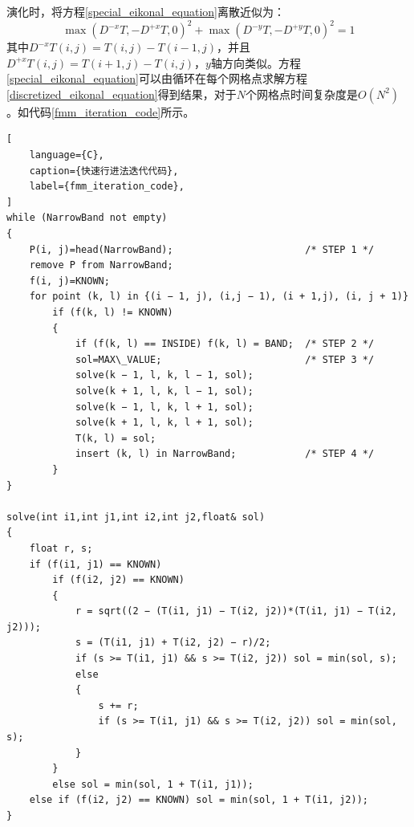 演化时，将方程\ref{special_eikonal_equation}离散近似为：
\begin{equation}
    \label{discretized_eikonal_equation}
    \max(D^{-x}T, -D^{+x}T, 0)^2 + \max(D^{-y}T, -D^{+y}T, 0)^2 = 1
\end{equation}
其中$D^{-x}T(i, j) = T(i, j) - T(i - 1, j)$，并且$D^{+x}T(i, j) = T(i + 1, j) - T(i, j)$，$y$轴方向类似。方程\ref{special_eikonal_equation}可以由循环在每个网格点求解方程\ref{discretized_eikonal_equation}得到结果，对于$N$个网格点时间复杂度是$O(N^2)$。如代码\ref{fmm_iteration_code}所示。
\begin{lstlisting}[
    language={C},
    caption={快速行进法迭代代码},
    label={fmm_iteration_code},
]
while (NarrowBand not empty)
{
    P(i, j)=head(NarrowBand); 						/* STEP 1 */
    remove P from NarrowBand;
    f(i, j)=KNOWN;
    for point (k, l) in {(i − 1, j), (i,j − 1), (i + 1,j), (i, j + 1)}
        if (f(k, l) != KNOWN)
        {
            if (f(k, l) == INSIDE) f(k, l) = BAND; 	/* STEP 2 */
            sol=MAX\_VALUE; 						/* STEP 3 */
            solve(k − 1, l, k, l − 1, sol);
            solve(k + 1, l, k, l − 1, sol);
            solve(k − 1, l, k, l + 1, sol);
            solve(k + 1, l, k, l + 1, sol);
            T(k, l) = sol;
            insert (k, l) in NarrowBand; 			/* STEP 4 */
        }
}

solve(int i1,int j1,int i2,int j2,float& sol)
{
    float r, s;
    if (f(i1, j1) == KNOWN)
        if (f(i2, j2) == KNOWN)
        {
            r = sqrt((2 − (T(i1, j1) − T(i2, j2))*(T(i1, j1) − T(i2, j2)));
            s = (T(i1, j1) + T(i2, j2) − r)/2;
            if (s >= T(i1, j1) && s >= T(i2, j2)) sol = min(sol, s);
            else
            {
                s += r;
                if (s >= T(i1, j1) && s >= T(i2, j2)) sol = min(sol, s);
            }
        }
        else sol = min(sol, 1 + T(i1, j1));
    else if (f(i2, j2) == KNOWN) sol = min(sol, 1 + T(i1, j2));
}
\end{lstlisting}

